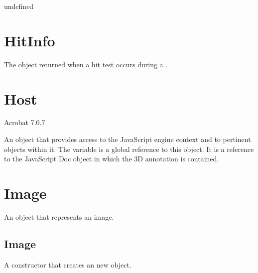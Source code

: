 \documentclass[letterpaper,12pt,english,openany,oneside]{sphinxmanual}
\begin{document}
\label{\detokenize{JS_3D_API:syntax-31}}

\begin{sphinxVerbatim}[commandchars=\\\{\}]
\end{sphinxVerbatim}
\label{\detokenize{JS_3D_API:parameters-20}}

\label{\detokenize{JS_3D_API:section-31}}\label{\detokenize{JS_3D_API:returns-31}}

undefined


\section{HitInfo}
\label{\detokenize{JS_3D_API:hitinfo}}
The object returned when a hit test occurs during a .

\label{\detokenize{JS_3D_API:properties-10}}


\section{Host}
\label{\detokenize{JS_3D_API:host}}
Acrobat 7.0.7

An object that provides access to the JavaScript engine context and to pertinent objects within it. The variable  is a global reference to this object. It is a reference to the JavaScript Doc object in which the 3D annotation is contained.


\section{Image}
\label{\detokenize{JS_3D_API:image}}
An object that represents an image.

\label{\detokenize{JS_3D_API:properties-11}}


\subsection{Image}
\label{\detokenize{JS_3D_API:image-1}}\label{\detokenize{JS_3D_API:id8}}
A constructor that creates an new  object.
\end{document}
